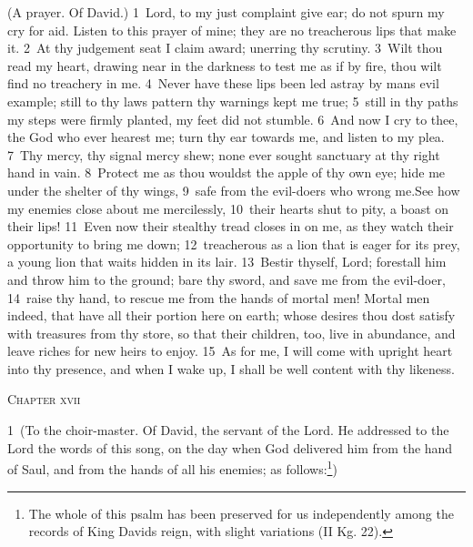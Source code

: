 \documentclass[10pt]{book} %
\begin{document}
(A prayer. Of David.)
\textcolor{benred8}{1}~Lord, to my just complaint give ear; do not spurn my cry for aid. Listen to this prayer of mine; they are no treacherous lips that make it. \textcolor{benred8}{2}~At thy judgement seat I claim award; unerring thy scrutiny. \textcolor{benred8}{3}~Wilt thou read my heart, drawing near in the darkness to test me as if by fire, thou wilt find no treachery in me. \textcolor{benred8}{4}~Never have these lips been led astray by man\textquotesingle s evil example; still to thy law\textquotesingle s pattern thy warnings kept me true; \textcolor{benred8}{5}~still in thy paths my steps were firmly planted, my feet did not stumble.
\textcolor{benred8}{6}~And now I cry to thee, the God who ever hearest me; turn thy ear towards me, and listen to my plea. \textcolor{benred8}{7}~Thy mercy, thy signal mercy shew; none ever sought sanctuary at thy right hand in vain. \textcolor{benred8}{8}~Protect me as thou wouldst the apple of thy own eye; hide me under the shelter of thy wings, \textcolor{benred8}{9}~safe from the evil-doers who wrong me.See how my enemies close about me mercilessly, \textcolor{benred8}{10}~their hearts shut to pity, a boast on their lips! \textcolor{benred8}{11}~Even now their stealthy tread closes in on me, as they watch their opportunity to bring me down; \textcolor{benred8}{12}~treacherous as a lion that is eager for its prey, a young lion that waits hidden in its lair.
\textcolor{benred8}{13}~Bestir thyself, Lord; forestall him and throw him to the ground; bare thy sword, and save me from the evil-doer, \textcolor{benred8}{14}~raise thy hand, to rescue me from the hands of mortal men! Mortal men indeed, that have all their portion here on earth; whose desires thou dost satisfy with treasures from thy store, so that their children, too, live in abundance, and leave riches for new heirs to enjoy. \textcolor{benred8}{15}~As for me, I will come with upright heart into thy presence, and when I wake up, I shall be well content with thy likeness.
\begin{large}\begin{center}\textsc{Chapter xvii}\end{center}\end{large}
\textcolor{benred8}{1}~(To the choir-master. Of David, the servant of the Lord. He addressed to the Lord the words of this song, on the day when God delivered him from the hand of Saul, and from the hands of all his enemies; as follows:\footnote[1]{The whole of this psalm has been preserved for us independently among the records of King David\textquotesingle s reign, with slight variations (II Kg. 22).})
\end{document}

